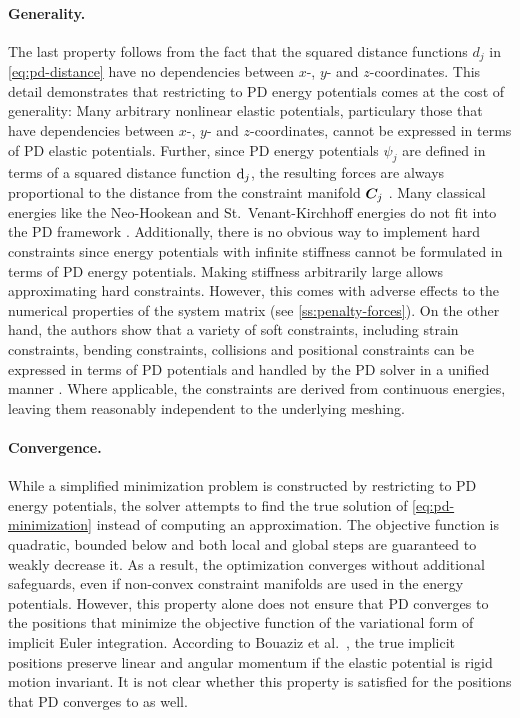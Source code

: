 \paragraph{Generality.}
The last property follows from the fact that the squared distance functions $d_j$ in \autoref{eq:pd-distance} have no dependencies between 
$x$-, $y$- and $z$-coordinates. This detail demonstrates that restricting to PD energy potentials comes at the cost of generality: 
Many arbitrary nonlinear elastic potentials, particulary those that have dependencies between $x$-, $y$- and $z$-coordinates, cannot be expressed 
in terms of PD elastic potentials. Further, since PD energy potentials $\psi_j$ are defined in terms of a squared distance function $\mathrm{d}_j$, the 
resulting forces are always proportional to the distance from the constraint manifold $\bm{C}_j$ \cite{overby2017}. Many classical energies 
like the Neo-Hookean and St.\ Venant-Kirchhoff energies do not fit into the PD framework \cite{liu2017}. Additionally, there is no obvious way to 
implement hard constraints since energy potentials with infinite stiffness cannot be formulated in terms of PD energy potentials. Making stiffness arbitrarily 
large allows approximating hard constraints. However, this comes with adverse effects to the numerical properties of the system matrix (see 
\cref{ss:penalty-forces}). On the other hand, the authors show that a variety of soft constraints, including strain constraints, bending constraints, 
collisions and positional constraints can be expressed in terms of PD potentials and handled by the PD solver in a unified manner \cite{bouaziz2014}. 
Where applicable, the constraints are derived from continuous energies, leaving them reasonably independent to the underlying meshing.

\paragraph{Convergence.}
While a simplified minimization problem is constructed by restricting to PD energy potentials, the solver attempts to find the 
true solution of \autoref{eq:pd-minimization} instead of computing an approximation. The objective function is quadratic, bounded below 
and both local and global steps are guaranteed to weakly decrease it. As a result, the optimization converges without additional 
safeguards, even if non-convex constraint manifolds are used in the energy potentials. However, this property alone does not ensure that 
PD converges to the positions that minimize the objective function of the variational form of implicit Euler integration. 
According to Bouaziz et al.\ \cite{bouaziz2014}, the true implicit positions preserve linear and angular momentum if the elastic potential 
is rigid motion invariant. It is not clear whether this property is satisfied for the positions that PD converges to as well.

